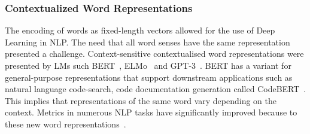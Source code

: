 \subsubsection{Contextualized Word Representations}
The encoding of words as fixed-length vectors allowed for the use of Deep Learning in NLP. The need that all word senses have the same representation presented a challenge. Context-sensitive contextualised word representations were presented by LMs such BERT~\cite{bert}, ELMo~\cite{elmo} and GPT-3~\cite{Gpt3}. 
BERT has a variant for general-purpose representations that support downstream applications such as natural language code-search, code documentation generation called CodeBERT~\cite{codebert}. This implies that representations of the same word vary depending on the context. 
Metrics in numerous NLP tasks have significantly improved because to these new word representations~\cite{contextual}. 